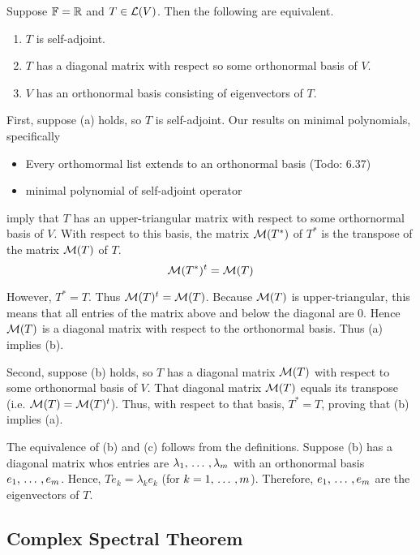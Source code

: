 \begin{thm}
  Suppose $\mathbb{F} = \mathbb{R}$ and $T \in \mathcal{L} (V)$. Then the following are equivalent.
  \begin{enumerate}[label=\textbf{(\alph*)}]
    \item $T$ is self-adjoint.
    \item $T$ has a diagonal matrix with respect so some orthonormal basis of $V$.
    \item $V$ has an orthonormal basis consisting of eigenvectors of $T$.
  \end{enumerate}
\end{thm}
\begin{prf}
  \StepOne First, suppose (a) holds, so $T$ is self-adjoint. Our results on minimal polynomials, specifically
  \begin{itemize}
    \item Every orthomormal list extends to an orthonormal basis (Todo: 6.37)
    \item minimal polynomial of self-adjoint operator
  \end{itemize}

  imply that $T$ has an upper-triangular matrix with respect to some orthornormal basis of $V$. With respect to this basis, the matrix $\mathcal{M}(T^*)$ of $T^*$ is the transpose of the matrix $\mathcal{M}(T)$ of $T$.
  \[
  \mathcal{M}(T^*)^t = \mathcal{M}(T)
  \]

  However, $T^*=T$. Thus $\mathcal{M}(T)^t=\mathcal{M}(T)$. Because $\mathcal{M}(T)$ is upper-triangular, this means that all entries of the matrix above and below the diagonal are $0$. Hence $\mathcal{M}(T)$  is a diagonal matrix with respect to the orthonormal basis. Thus (a) implies (b).

  \StepTwo Second, suppose (b) holds, so $T$ has a diagonal matrix $\mathcal{M}(T)$ with respect to some orthonormal basis of $V$. That diagonal matrix $\mathcal{M}(T)$ equals its transpose (i.e. $\mathcal{M}(T)= \mathcal{M}(T)^t$). Thus, with respect to that basis, $T^*=T$, proving that (b) implies (a).

  \StepThree The equivalence of (b) and (c) follows from the definitions. Suppose (b) has a diagonal matrix whos entries are $\lambda_1, {\, \ldots \,\,}, \lambda_m$ with an orthonormal basis $e_1, {\, \ldots \,\,}, e_m$. Hence, $Te_k = \lambda_k e_k$ (for $k = 1, {\, \ldots \,\,}, m$). Therefore, $e_1, {\, \ldots \,\,}, e_m$ are the eigenvectors of $T$.
\end{prf}

\subsection{Complex Spectral Theorem}

